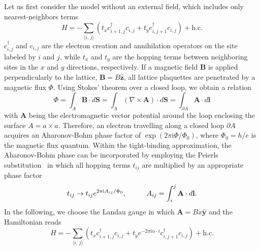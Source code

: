 Let us first consider the model without an external field, which includes only nearest-neighbors terms
\begin{equation}
H =  - \sum_{\langle i, \, j \rangle} \left( t_x c^{\dagger}_{i+1, j } c_{i, j} + t_y c^{\dagger}_{i, j +1 } c_{i, j}  \right) + \mathrm{h.c.}
\label{tb:generic}
\end{equation} 
$c^{\dagger}_{i, j }$ and  $c_{i, j }$ are the electron creation and annihilation operators on the site labeled by $i$ and $j$, while $t_x$ and $t_y$ are the hopping terms between neighboring sites in the $x$ and $y$ directions, respectively. If a magnetic field $\mathbf{B}$ is applied perpendicularly to the lattice, $\mathbf{B} = B \hat{\mathbf{z}}$, all lattice plaquettes are penetrated by a magnetic flux $\Phi$. Using Stokes' theorem over a closed loop, we obtain a relation
\begin{equation}
\Phi = \int_{A} \mathbf{B} \cdot d \mathbf{S}  = \int_{A} ( \nabla \times \mathbf{A} ) \cdot d \mathbf{S}  = \int_{\partial A}  \mathbf{A} \cdot d \mathbf{l} 
\label{eq:stokes}
\end{equation}
with $\mathbf{A}$ being the electromagnetic vector potential around the loop enclosing the surface $A = a \times a$. Therefore, an electron travelling along a closed loop $\partial A$ acquires an Aharonov-Bohm phase factor of $\exp (2 \pi \mathrm{i} \Phi / \Phi_0)$, where $\Phi_0 = h / e$ is the magnetic flux quantum. Within the tight-binding approximation, the Aharonov-Bohm phase can be incorporated by employing the Peierls substitution~\cite{Peierls1933} in which all hopping terms $t_{ij}$ are multiplied by an appropriate phase factor
\begin{equation}
t_{ij} \rightarrow t_{ij} e^{2 \pi \mathrm{i} A_{ij} / \Phi_0}, \hspace*{1cm} A_{ij} = \int_i^j \mathbf{A} \cdot  d \mathbf{l}.
\label{eq:peierls}
\end{equation}
In the following, we choose the Landau gauge in which $\mathbf{A} = B x \hat{\mathbf{y}}$ and the Hamiltonian reads 
\begin{equation}
H = - \sum_{\langle i, \, j \rangle} \left( t_x c^{\dagger}_{i+1, j } c_{i, j} + t_y  e^{- 2 \pi \mathrm{i} \alpha \cdot i } c^{\dagger}_{i, j +1 } c_{i, j}  \right) + \mathrm{h.c.}
\label{eq:ham_landau_gauge}
\end{equation}

